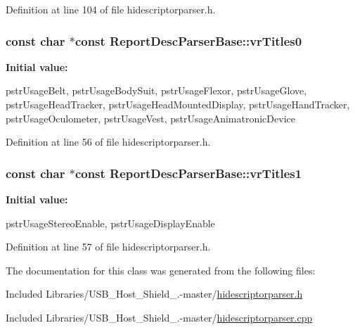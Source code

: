 \-Definition at line 104 of file hidescriptorparser.\-h.

\hypertarget{class_report_desc_parser_base_a42d34a0a49f987c9dcfdd4fb8d42bf0d}{
\subsubsection[{vr\-Titles0}]{\setlength{\rightskip}{0pt plus 5cm}const char $\ast$const {\bf \-Report\-Desc\-Parser\-Base\-::vr\-Titles0}}}\label{class_report_desc_parser_base_a42d34a0a49f987c9dcfdd4fb8d42bf0d}
{\bfseries \-Initial value\-:}
\begin{DoxyCode}
 {
        pstrUsageBelt,
        pstrUsageBodySuit,
        pstrUsageFlexor,
        pstrUsageGlove,
        pstrUsageHeadTracker,
        pstrUsageHeadMountedDisplay,
        pstrUsageHandTracker,
        pstrUsageOculometer,
        pstrUsageVest,
        pstrUsageAnimatronicDevice
}
\end{DoxyCode}


\-Definition at line 56 of file hidescriptorparser.\-h.

\hypertarget{class_report_desc_parser_base_a41af57cb0fb0bbed7277bcd04a9e9fe9}{
\subsubsection[{vr\-Titles1}]{\setlength{\rightskip}{0pt plus 5cm}const char $\ast$const {\bf \-Report\-Desc\-Parser\-Base\-::vr\-Titles1}}}\label{class_report_desc_parser_base_a41af57cb0fb0bbed7277bcd04a9e9fe9}
{\bfseries \-Initial value\-:}
\begin{DoxyCode}
 {
        pstrUsageStereoEnable,
        pstrUsageDisplayEnable
}
\end{DoxyCode}


\-Definition at line 57 of file hidescriptorparser.\-h.



\-The documentation for this class was generated from the following files\-:\begin{DoxyCompactItemize}
\item 
\-Included Libraries/\-U\-S\-B\-\_\-\-Host\-\_\-\-Shield\-\_.-\/master/\hyperlink{hidescriptorparser_8h}{hidescriptorparser.\-h}\item 
\-Included Libraries/\-U\-S\-B\-\_\-\-Host\-\_\-\-Shield\-\_.-\/master/\hyperlink{hidescriptorparser_8cpp}{hidescriptorparser.\-cpp}\end{DoxyCompactItemize}
